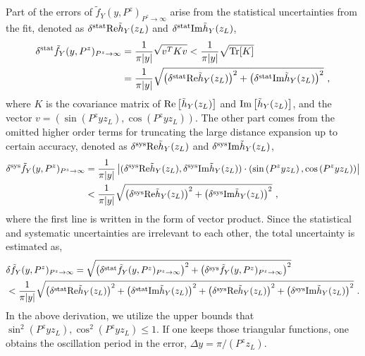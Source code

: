 \documentclass[a4paper,11pt]{article}
\begin{document}
Part of the errors of $\tilde f_{Y}(y,P^z)_{P^z \rightarrow\infty}$ arise from the statistical uncertainties from the fit, denoted as $\delta^{\rm stat}{\rm Re}\tilde{h}_{Y}(z_L)$ and $\delta^{\rm stat}{\rm Im}\tilde{h}_{Y}(z_L)$,
\begin{align}\label{eq:errbudstatY}
\delta^{\rm stat} \tilde f_{Y}(y,P^z)_{P^z \rightarrow\infty} &= \frac{1}{\pi |y|} \sqrt{ v^{T} K v} < \frac{1}{\pi |y|} \sqrt{ {\rm Tr}[K]} \nonumber\\
&= \frac{1}{\pi |y|} \sqrt{\left(\delta^{\rm stat}{\rm Re}\tilde{h}_{Y}(z_L)\right)^2 + \left(\delta^{\rm stat}{\rm Im}\tilde{h}_{Y}(z_L)\right)^2} \ ,
\end{align}
where $K$ is the covariance matrix of ${\rm Re}\left[\tilde{h}_{Y}(z_L)\right]$ and ${\rm Im}\left[\tilde{h}_{Y}(z_L)\right]$, and the vector $v = (\sin \left(P^z y z_L\right),\cos \left(P^z y z_L\right))$. The other part comes from the omitted higher order terms for truncating the large distance expansion up to certain accuracy, denoted as $\delta^{\rm sys}{\rm Re}\tilde{h}_Y(z_L)$ and $\delta^{\rm sys}{\rm Im}\tilde{h}_Y(z_L)$,
\begin{align}\label{eq:errbudsysY}
\delta^{\rm sys} \tilde f_{Y}(y,P^z)_{P^z \rightarrow\infty} &= \frac{1}{\pi |y|} 
\left| (\delta^{\rm sys}{\rm Re}\tilde{h}_Y(z_L),\delta^{\rm sys}{\rm Im}\tilde{h}_Y(z_L)) \cdot \left(\sin \left(P^z y z_L\right), \cos \left(P^z y z_L\right)\right) \right| \nonumber\\
&< \frac{1}{\pi |y|} \sqrt{\left(\delta^{\rm sys}{\rm Re}\tilde{h}_{Y}(z_L)\right)^2 + \left(\delta^{\rm sys}{\rm Im}\tilde{h}_{Y}(z_L)\right)^2} \ ,
\end{align}
where the first line is written in the form of vector product. Since the statistical and systematic uncertainties are irrelevant to each other, the total uncertainty is estimated as,
\begin{align}\label{eq:errbudY}
&\delta \tilde f_{Y}(y,P^z)_{P^z \rightarrow\infty} = \sqrt{\left(\delta^{\rm stat} \tilde f_{Y}(y,P^z)_{P^z \rightarrow\infty}\right)^2 + \left(\delta^{\rm sys} \tilde f_{Y}(y,P^z)_{P^z \rightarrow\infty}\right)^2} \nonumber\\
&< \frac{1}{\pi |y|} \sqrt{\left(\delta^{\rm stat}{\rm Re}\tilde{h}_{Y}(z_L)\right)^2 + \left(\delta^{\rm stat}{\rm Im}\tilde{h}_{Y}(z_L)\right)^2 + \left(\delta^{\rm sys}{\rm Re}\tilde{h}_{Y}(z_L)\right)^2 + \left(\delta^{\rm sys}{\rm Im}\tilde{h}_{Y}(z_L)\right)^2} \ .
\end{align}
In the above derivation, we utilize the upper bounds that $\sin^2\left(P^z y z_L\right), \cos^2\left(P^z y z_L\right) \leq 1$. If one keeps those triangular functions, one obtains the oscillation period in the error, $\Delta y = \pi/(P^z z_L)$. 
\end{document}
